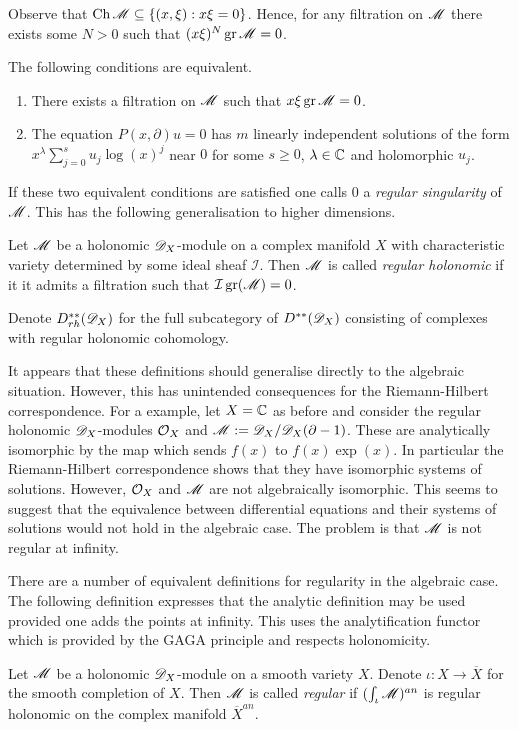 Observe that $\operatorname{Ch} \mathscr{M}\subseteq \{(x,\xi): x\xi = 0\}$.
Hence, for any filtration on $\mathscr{M}$ there exists some $N>0$ such that
$(x\xi)^N \operatorname{gr}\mathscr{M} = 0 $.
\begin{proposition}{\cite[Section 5.1]{kashiwara2003d}}
  The following conditions are equivalent.
  \begin{enumerate}
    \item There exists a filtration on $\mathscr{M}$ such that $x\xi\operatorname{gr}\mathscr{M} = 0$.
    \item The equation $P(x,\partial)u=0$ has $m$ linearly independent solutions of the form $x^\lambda \sum_{j=0}^s u_j \log(x)^j $
    near $0$ for some $s\geq 0$, $\lambda \in \mathbb{C}$ and holomorphic $u_j$.
  \end{enumerate}
\end{proposition}
If these two equivalent conditions are satisfied one calls $0$ a {\it regular singularity} of $\mathscr{M}$.
This has the following generalisation to higher dimensions.
\begin{definition}
   Let $\mathscr{M}$ be a holonomic $\mathscr{D}_X$-module on a complex manifold $X$ with characteristic variety determined by some ideal sheaf $\mathcal{I}$.
   Then $\mathscr{M}$ is called {\it regular holonomic} if it it admits a filtration such that $\mathcal{I} \operatorname{gr}(\mathscr{M}) = 0$.
\end{definition}
Denote $D^{**}_{rh}(\mathscr{D}_X)$ for the full subcategory of $D^{**}(\mathscr{D}_X)$ consisting of complexes with regular holonomic cohomology.

It appears that these definitions should generalise directly to the algebraic situation.
However, this has unintended consequences for the Riemann-Hilbert correspondence.
For a example, let $X = \mathbb{C}$ as before and consider the regular holonomic $\mathscr{D}_X$-modules $\mathcal{O}_X$ and $\mathscr{M} := \mathscr{D}_X/\mathscr{D}_X(\partial - 1)$.
These are analytically isomorphic by the map which sends $f(x)$ to $f(x)\exp(x)$.
In particular the Riemann-Hilbert correspondence shows that they have isomorphic systems of solutions.
However, $\mathcal{O}_X$ and $\mathscr{M}$ are not algebraically isomorphic.
This seems to suggest that the equivalence between differential equations and their systems of solutions would not hold in the algebraic case.
The problem is that $\mathscr{M}$ is not regular at infinity.

There are a number of equivalent definitions for regularity in the algebraic case.
The following definition expresses that the analytic definition may be used provided one adds the points at infinity.
This uses the analytification functor which is provided by the GAGA principle and respects holonomicity.
\begin{definition}
  Let $\mathscr{M}$ be a holonomic $\mathscr{D}_X$-module on a smooth variety $X$.
  Denote $\iota:X \to \overline{X}$ for the smooth completion of $X$.
  Then $\mathscr{M}$ is called {\it regular} if $(\int_\iota \mathscr{M})^{an}$ is regular holonomic on the complex manifold $\overline{X}^{an}$.
\end{definition}
